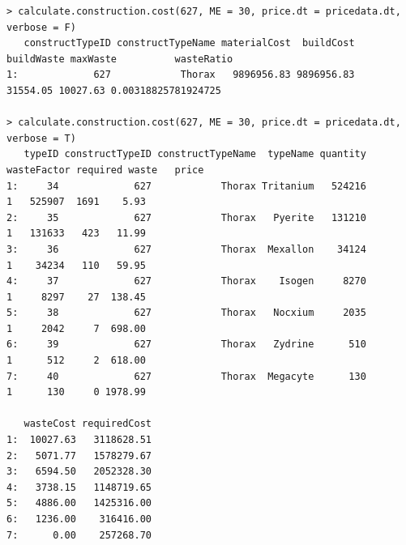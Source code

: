 \documentclass[12pt]{beamer}
\begin{document}
\begin{frame}[fragile]
\begin{verbatim}
> calculate.construction.cost(627, ME = 30, price.dt = pricedata.dt, verbose = F)
   constructTypeID constructTypeName materialCost  buildCost buildWaste maxWaste          wasteRatio
1:             627            Thorax   9896956.83 9896956.83   31554.05 10027.63 0.00318825781924725

> calculate.construction.cost(627, ME = 30, price.dt = pricedata.dt, verbose = T)
   typeID constructTypeID constructTypeName  typeName quantity wasteFactor required waste   price
1:     34             627            Thorax Tritanium   524216           1   525907  1691    5.93
2:     35             627            Thorax   Pyerite   131210           1   131633   423   11.99
3:     36             627            Thorax  Mexallon    34124           1    34234   110   59.95
4:     37             627            Thorax    Isogen     8270           1     8297    27  138.45
5:     38             627            Thorax   Nocxium     2035           1     2042     7  698.00
6:     39             627            Thorax   Zydrine      510           1      512     2  618.00
7:     40             627            Thorax  Megacyte      130           1      130     0 1978.99

   wasteCost requiredCost
1:  10027.63   3118628.51
2:   5071.77   1578279.67
3:   6594.50   2052328.30
4:   3738.15   1148719.65
5:   4886.00   1425316.00
6:   1236.00    316416.00
7:      0.00    257268.70
\end{verbatim}
\end{frame}
\end{document}
